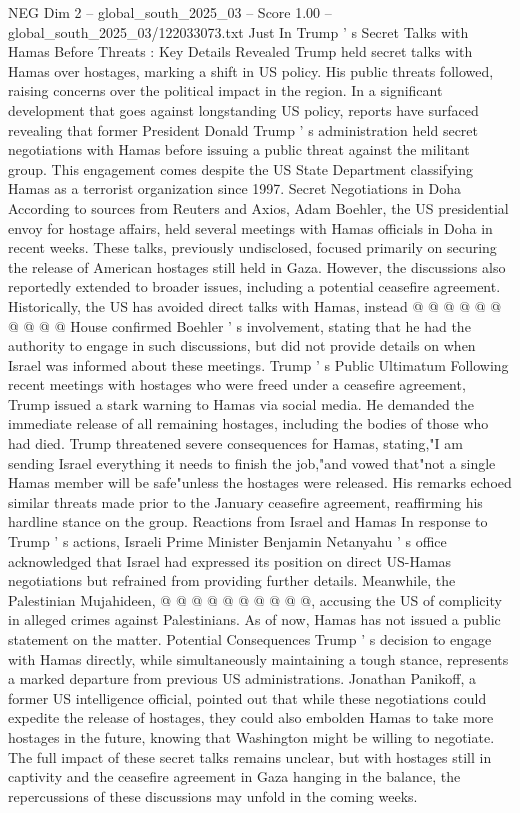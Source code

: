 \begin{textsample}{NEG Dim 2 – global\_south\_2025\_03 – Score 1.00 – global\_south\_2025\_03/122033073.txt}  \label{ex:f2_neg_144}
Just In Trump ' s Secret Talks with Hamas Before Threats : Key Details Revealed Trump held secret talks with Hamas over hostages, marking a shift in US policy.
His public threats followed, raising concerns over the political impact in the region.
In a significant development that goes against longstanding US policy, reports have surfaced revealing that former President Donald Trump ' s administration held secret negotiations with Hamas before issuing a public threat against the militant group.
This engagement comes despite the US State Department classifying Hamas as a terrorist organization since 1997.
Secret Negotiations in Doha According to sources from Reuters and Axios, Adam Boehler, the US presidential envoy for hostage affairs, held several meetings with Hamas officials in Doha in recent weeks.
These talks, previously undisclosed, focused primarily on securing the release of American hostages still held in Gaza.
However, the discussions also reportedly extended to broader issues, including a potential ceasefire agreement.
Historically, the US has avoided direct talks with Hamas, instead @ @ @ @ @ @ @ @ @ @ House confirmed Boehler ' s involvement, stating that he had the authority to engage in such discussions, but did not provide details on when Israel was informed about these meetings.
Trump ' s Public Ultimatum Following recent meetings with hostages who were freed under a ceasefire agreement, Trump issued a stark warning to Hamas via social media.
He demanded the immediate release of all remaining hostages, including the bodies of those who had died.
Trump threatened severe consequences for Hamas, stating,"I am sending Israel everything it needs to finish the job,"and vowed that"not a single Hamas member will be safe"unless the hostages were released.
His remarks echoed similar threats made prior to the January ceasefire agreement, reaffirming his hardline stance on the group.
Reactions from Israel and Hamas In response to Trump ' s actions, Israeli Prime Minister Benjamin Netanyahu ' s office acknowledged that Israel had expressed its position on direct US-Hamas negotiations but refrained from providing further details.
Meanwhile, the Palestinian Mujahideen, @ @ @ @ @ @ @ @ @ @, accusing the US of complicity in alleged crimes against Palestinians.
As of now, Hamas has not issued a public statement on the matter.
Potential Consequences Trump ' s decision to engage with Hamas directly, while simultaneously maintaining a tough stance, represents a marked departure from previous US administrations.
Jonathan Panikoff, a former US intelligence official, pointed out that while these negotiations could expedite the release of hostages, they could also embolden Hamas to take more hostages in the future, knowing that Washington might be willing to negotiate.
The full impact of these secret talks remains unclear, but with hostages still in captivity and the ceasefire agreement in Gaza hanging in the balance, the repercussions of these discussions may unfold in the coming weeks.

\end{textsample}
